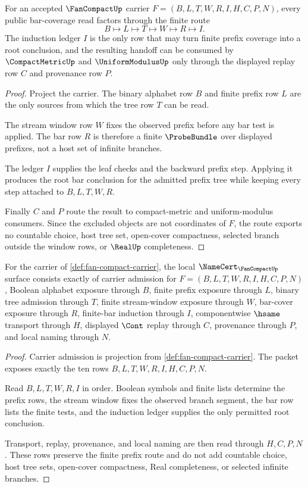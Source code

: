 \begin{theorem}
\label{thm:fan-compact-finite-bar-induction}
For an accepted $\FanCompactUp$ carrier $F=(B,L,T,W,R,I,H,C,P,N)$, every public bar-coverage read factors through the finite route
$$
B \longmapsto L \longmapsto T \longmapsto W \longmapsto R \longmapsto I .
$$
The induction ledger $I$ is the only row that may turn finite prefix coverage into a root conclusion, and the resulting handoff can be consumed by $\CompactMetricUp$ and $\UniformModulusUp$ only through the displayed replay row $C$ and provenance row $P$.
\end{theorem}
\begin{proof}
Project the carrier. The binary alphabet row $B$ and finite prefix row $L$ are the only sources from which the tree row $T$ can be read.

The stream window row $W$ fixes the observed prefix before any bar test is applied. The bar row $R$ is therefore a finite $\ProbeBundle$ over displayed prefixes, not a host set of infinite branches.

The ledger $I$ supplies the leaf checks and the backward prefix step. Applying it produces the root bar conclusion for the admitted prefix tree while keeping every step attached to $B,L,T,W,R$.

Finally $C$ and $P$ route the result to compact-metric and uniform-modulus consumers. Since the excluded objects are not coordinates of $F$, the route exports no countable choice, host tree set, open-cover compactness, selected branch outside the window rows, or $\RealUp$ completeness.
\end{proof}

\begin{theorem}
\label{thm:fan-compact-namecert-obligations}
For the carrier of \autoref{def:fan-compact-carrier}, the local $\NameCert_{\FanCompactUp}$ surface consists exactly of carrier admission for $F=(B,L,T,W,R,I,H,C,P,N)$, Boolean alphabet exposure through $B$, finite prefix exposure through $L$, binary tree admission through $T$, finite stream-window exposure through $W$, bar-cover exposure through $R$, finite-bar induction through $I$, componentwise $\hsame$ transport through $H$, displayed $\Cont$ replay through $C$, provenance through $P$, and local naming through $N$.
\end{theorem}
\begin{proof}
Carrier admission is projection from \autoref{def:fan-compact-carrier}. The packet exposes exactly the ten rows $B,L,T,W,R,I,H,C,P,N$.

Read $B,L,T,W,R,I$ in order. Boolean symbols and finite lists determine the prefix rows, the stream window fixes the observed branch segment, the bar row lists the finite tests, and the induction ledger supplies the only permitted root conclusion.

Transport, replay, provenance, and local naming are then read through $H,C,P,N$. These rows preserve the finite prefix route and do not add countable choice, host tree sets, open-cover compactness, Real completeness, or selected infinite branches.
\end{proof}

